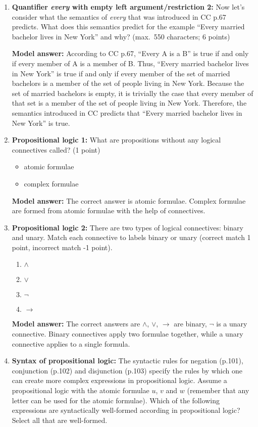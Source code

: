 \documentclass[a4,11pt]{article}
\newcommand{\6}{\mbox{$[\hspace*{-.6mm}[$}}
\newcommand{\9}{\mbox{$]\hspace*{-.6mm}]$}}
\begin{document}
\begin{enumerate}[leftmargin = 12pt]
\item {\bf Quantifier {\em every} with empty left argument/restriction 2:} Now let's consider what the semantics of {\em every} that was introduced in CC p.67 predicts. What does this semantics predict for the example ``Every married bachelor lives in New York'' and why? (max.\ 550 characters; 6 points)

{\bf Model answer:} According to CC p.67, ``Every A is a B'' is true if and only if every member of A is a member of B. Thus, ``Every married bachelor lives in New York'' is true if and only if every member of the set of married bachelors is a member of the set of people living in New York. Because the set of married bachelors is empty, it is trivially the case that every member of that set is a member of the set of people living in New York. Therefore, the semantics introduced in CC predicts that ``Every married bachelor lives in New York''  is true.

\item {\bf Propositional logic 1:} What are propositions without any logical connectives called?  (1 point)

\begin{itemize}[noitemsep]
\item atomic formulae
\item complex formulae
\end{itemize}

{\bf Model answer:} The correct answer is atomic formulae. Complex formulae are formed from atomic formulae with the help of connectives.

\item {\bf Propositional logic 2:} There are two types of logical connectives: binary and unary. Match each connective to labels binary or unary (correct match 1 point, incorrect match -1 point).

\begin{enumerate}[noitemsep]
\item $\land$
\item $\lor$
\item $\neg$
\item $\rightarrow$
\end{enumerate}

{\bf Model answer:} The correct answers are $\land$, $\lor$, $\rightarrow$ are binary, $\neg$ is a unary connective. Binary connectives apply two formulae together, while a unary connective applies to a single formula.

\item {\bf Syntax of propositional logic:} The syntactic rules for negation (p.101), conjunction (p.102) and disjunction (p.103) specify the rules by which one can create more complex expressions in propositional logic. Assume a propositional logic with the atomic formulae $u$, $v$ and $w$ (remember that any letter can be used for the atomic formulae). Which of the following expressions are syntactically well-formed according in propositional logic? Select all that are well-formed.


\end{enumerate}
\end{document}
